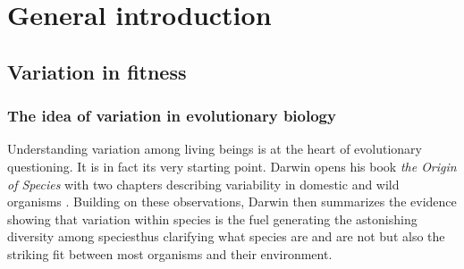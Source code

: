 
\chapter[Chapter 1: General introduction]{General introduction}

\section{Variation in fitness}
\subsection{The idea of variation in evolutionary biology}
Understanding variation among living beings is at the heart of evolutionary questioning. It is in fact its very starting point. Darwin opens his book \emph{the Origin of Species} with two chapters describing variability in domestic and wild organisms \parencite{Darwin1859}.
Building on these observations, Darwin then summarizes the evidence showing that variation within species is the fuel generating the astonishing diversity among species\textemdash thus clarifying what species are and are not \parencite[][pp. 129-163]{Wilkins2009}\textemdash but also the striking fit between most organisms and their environment.

